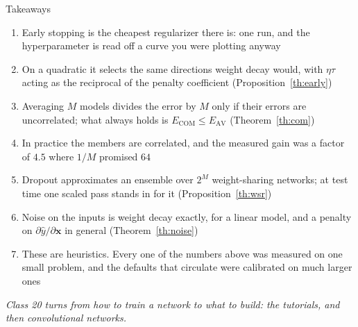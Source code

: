 \documentclass[aspectratio=169, 11pt]{beamer}
\newcommand{\bridge}[1]{%
  {\scriptsize\itshape\color{mcMuted} #1\par}\vspace{0.35em}}
\begin{document}
\begin{frame}{Takeaways}
  \vspace{-0.15em}
  {\scriptsize
  \begin{enumerate}\itemsep0.24em
    \item Early stopping is the cheapest regularizer there is: one run,
          and the hyperparameter is read off a curve you were plotting
          anyway
    \item On a quadratic it selects the same directions weight decay
          would, with $\eta\tau$ acting as the reciprocal of the
          penalty coefficient (Proposition~\ref{th:early})
    \item Averaging $M$ models divides the error by $M$ only if their
          errors are uncorrelated; what always holds is
          $E_{\mathrm{COM}} \leq E_{\mathrm{AV}}$ (Theorem~\ref{th:com})
    \item In practice the members are correlated, and the measured gain
          was a factor of $4.5$ where $1/M$ promised $64$
    \item Dropout approximates an ensemble over $2^M$ weight-sharing
          networks; at test time one scaled pass stands in for it
          (Proposition~\ref{th:wsr})
    \item Noise on the inputs is weight decay exactly, for a linear
          model, and a penalty on $\partial\hat y/\partial\mathbf{x}$ in
          general (Theorem~\ref{th:noise})
    \item These are heuristics. Every one of the numbers above was
          measured on one small problem, and the defaults that circulate
          were calibrated on much larger ones
  \end{enumerate}}
  \bridge{Class 20 turns from how to train a network to what to build:
  the tutorials, and then convolutional networks.}
\end{frame}
\end{document}
